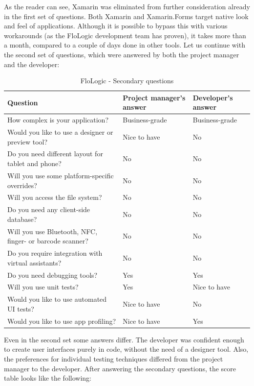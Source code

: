 \documentclass[english,master,public,dept460,male,cpdeclaration,oneside]{diploma}
\begin{document}
As the reader can see, Xamarin was eliminated from further consideration already in the first set of questions. Both Xamarin and Xamarin.Forms target native look and feel of applications. Although it is possible to bypass this with various workarounds (as the FloLogic development team has proven), it takes more than a month, compared to a couple of days done in other tools. 
Let us continue with the second set of questions, which were answered by both the project manager and the developer:

\begin{table}[!h]
	\centering
	\caption{FloLogic - Secondary questions}
	\begin{tabular}{p{5.5cm} | p{3.5cm} | p{3.5cm}}
		\toprule		
		\textbf{Question} &	\textbf{Project manager’s answer} & \textbf{Developer’s answer} \\
		\midrule
		How complex is your application? & Business-grade & Business-grade \\
		Would you like to use a designer or preview tool? & Nice to have & No \\
		Do you need different layout for tablet and phone? & No & No \\
		Will you use some platform-specific overrides? & No & No \\
		Will you access the file system? & No & No \\
		Do you need any client-side database? & No & No \\
		Will you use Bluetooth, NFC, finger- or barcode scanner? & No & No \\
		Do you require integration with virtual assistants? & No & No \\
		Do you need debugging tools? & Yes & Yes \\
		Will you use unit tests? & Yes & Nice to have \\
		Would you like to use automated UI tests? & Nice to have & No \\
		Would you like to use app profiling? & Nice to have & Yes \\		
		\midrule
	\end{tabular}
\end{table}

Even in the second set some answers differ. The developer was confident enough to create user interfaces purely in code, without the need of a designer tool. Also, the preferences for individual testing techniques differed from the project manager to the developer. After answering the secondary questions, the score table looks like the following:
\end{document}
